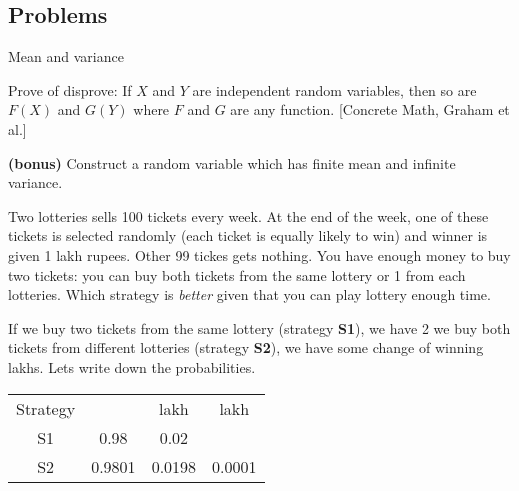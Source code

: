 \documentclass[a4paper,9pt, addpoints, solutions]{exam}
\newcommand\MEAN[1]{\langle #1\rangle}
\newcommand\VAR[1]{\text{Var}(#1)}
\newcommand\BONUS{\textbf{(bonus)} }
\begin{document}
\subsection*{Problems}
\begin{questions}

    \question Mean and variance

\question[5] Prove of disprove: If $X$ and $Y$ are independent random variables,
then so are $F(X)$ and $G(Y)$ where $F$ and $G$ are any function. [Concrete
Math, Graham et al.]

\question[3] \BONUS Construct a random variable which has finite mean and infinite
variance.

\question[10]
Two lotteries sells 100 tickets every week. At the end of the week, one of these
tickets is selected randomly (each ticket is equally likely to win) and winner
is given 1 lakh rupees. Other 99 tickes gets nothing. You have enough money to
buy two tickets: you can buy both tickets from the same lottery or 1 from each
lotteries. Which strategy is \textit{better} given that you can play lottery enough
time.

\begin{solution} 
    If we buy two tickets from the same lottery (strategy \textbf{S1}), we have
    2%
    we buy both tickets from different lotteries (strategy \textbf{S2}), we have
    some change of winning  lakhs. Lets write down the probabilities.

    \begin{tabular}{c c c c}
        Strategy                    & \rupee 0     & \rupee 1 lakh & \rupee 2 lakh \\
        S1                          & 0.98         & 0.02          & \\
        S2                          & 0.9801       & 0.0198        & 0.0001 \\
    \end{tabular}


\end{solution}
\end{questions}
\end{document}
